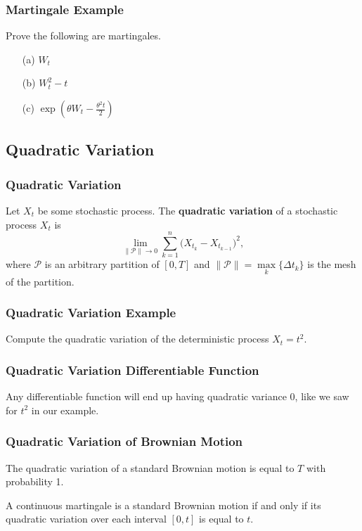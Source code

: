 \documentclass{beamer}
\begin{document}
\begin{frame}[t]
\frametitle{Martingale Example} 
\begin{Example}
Prove the following are martingales.
\begin{itemize}
\item[(a)] $W_t$
\item[(b)] $W_t^2 - t$
\item[(c)] $\exp\left(\theta W_t - \frac{\theta^2 t}{2}\right)$
\end{itemize}
\end{Example}

\end{frame}

\subsection{Quadratic Variation}

\begin{frame}
\frametitle{Quadratic Variation}
\begin{Definition}
Let $X_t$ be some stochastic process. The {\bf quadratic variation} of a stochastic process $X_t$ is
$$
\lim_{\|\mathcal{P}\|\to 0} \sum_{k = 1}^n \Big(X_{t_k} - X_{t_{k - 1}}\Big)^2,
$$
where $\mathcal{P}$ is an arbitrary partition of $[0, T]$ and $\|\mathcal{P}\| = \max\limits_k\{\Delta t_k\}$ is the mesh of the partition.
\end{Definition}
\end{frame}

\begin{frame}[t]
\frametitle{Quadratic Variation Example}
\begin{Example}
Compute the quadratic variation of the deterministic process $X_t = t^2$.
\end{Example}

\end{frame}

\begin{frame}
\frametitle{Quadratic Variation Differentiable Function}
Any differentiable function will end up having quadratic variance 0, like we saw for $t^2$ in our example. 
\end{frame}

\begin{frame}
\frametitle{Quadratic Variation of Brownian Motion}

\begin{Theorem}
The quadratic variation of a standard Brownian motion is equal to $T$ with probability 1.
\end{Theorem}

\begin{Theorem}
 A continuous martingale is a standard Brownian motion if and only if its quadratic variation over each interval $[0, t]$ is equal to $t$.
\end{Theorem}

\end{frame}
\end{document}
